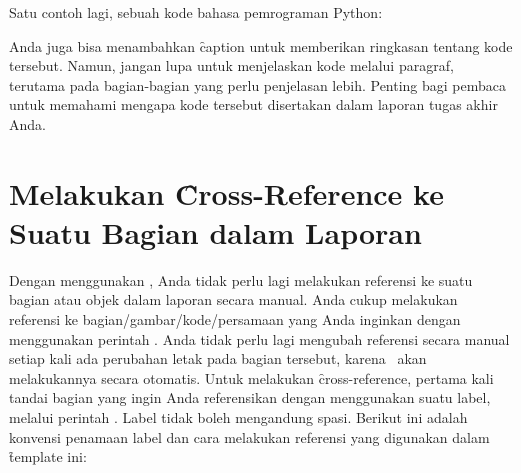 Satu contoh lagi, sebuah kode bahasa pemrograman Python:


Anda juga bisa menambahkan \f{caption} untuk memberikan ringkasan tentang kode tersebut.
Namun, jangan lupa untuk menjelaskan kode melalui paragraf, terutama pada bagian-bagian yang perlu penjelasan lebih.
Penting bagi pembaca untuk memahami mengapa kode tersebut disertakan dalam laporan tugas akhir Anda.


\section{Melakukan \f{Cross-Reference} ke Suatu Bagian dalam Laporan}
\label{sec:crossReference}
Dengan menggunakan \latex, Anda tidak perlu lagi melakukan referensi ke suatu bagian atau objek dalam laporan secara manual. Anda cukup melakukan referensi ke bagian/gambar/kode/persamaan yang Anda inginkan dengan menggunakan perintah . Anda tidak perlu lagi mengubah referensi secara manual setiap kali ada perubahan letak pada bagian tersebut, karena \latex~akan melakukannya secara otomatis. Untuk melakukan \f{cross-reference}, pertama kali tandai bagian yang ingin Anda referensikan dengan menggunakan suatu label, melalui perintah . Label tidak boleh mengandung spasi. Berikut ini adalah konvensi penamaan label dan cara melakukan referensi yang digunakan dalam \f{template} ini:
